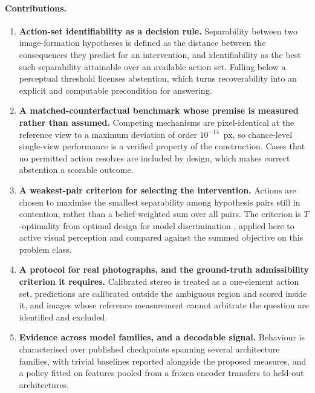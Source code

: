 \paragraph{Contributions.}
\begin{enumerate}\itemsep2pt
\item \textbf{Action-set identifiability as a decision rule.} Separability between
two image-formation hypotheses is defined as the distance between the consequences
they predict for an intervention, and identifiability as the best such separability
attainable over an available action set. Falling below a perceptual threshold
licenses abstention, which turns recoverability into an explicit and computable
precondition for answering.

\item \textbf{A matched-counterfactual benchmark whose premise is measured rather
than assumed.} Competing mechanisms are pixel-identical at the reference view to a
maximum deviation of order $10^{-14}$~px, so chance-level single-view performance
is a verified property of the construction. Cases that no permitted action
resolves are included by design, which makes correct abstention a scorable outcome.

\item \textbf{A weakest-pair criterion for selecting the intervention.} Actions
are chosen to maximise the smallest separability among hypothesis pairs still in
contention, rather than a belief-weighted sum over all pairs. The criterion is
$T$-optimality from optimal design for model discrimination
\citep{atkinson1975design,hunter1965experimental}, applied here to active visual
perception and compared against the summed objective on this problem class.

\item \textbf{A protocol for real photographs, and the ground-truth admissibility
criterion it requires.} Calibrated stereo is treated as a one-element action set,
predictions are calibrated outside the ambiguous region and scored inside it, and
images whose reference measurement cannot arbitrate the question are identified
and excluded.

\item \textbf{Evidence across model families, and a decodable signal.} Behaviour
is characterised over published checkpoints spanning several architecture families,
with trivial baselines reported alongside the proposed measures, and a policy
fitted on features pooled from a frozen encoder transfers to held-out
architectures.
\end{enumerate}
